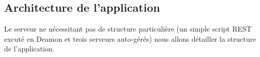 


\subsection{Architecture de l'application}


Le serveur ne nécessitant pas de structure particulière (un simple script REST excuté en Deamon et trois serveurs auto-gérés) nous allons détailler la structure de l'application.

